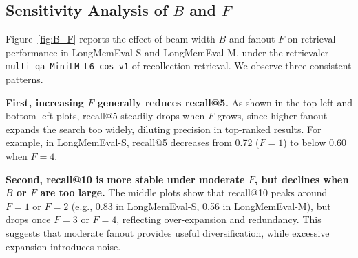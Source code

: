 


\subsection{Sensitivity Analysis of $B$ and $F$}
\label{app:B_F}
Figure~\ref{fig:B_F} reports the effect of beam width $B$ and fanout $F$ on retrieval performance in LongMemEval-S and LongMemEval-M, under the retrievaler \texttt{multi-qa-MiniLM-L6-cos-v1} of recollection retrieval.  We observe three consistent patterns. 

\textbf{First, increasing $F$ generally reduces recall@5.}  
As shown in the top-left and bottom-left plots, recall@5 steadily drops when $F$ grows, since higher fanout expands the search too widely, diluting precision in top-ranked results. For example, in LongMemEval-S, recall@5 decreases from 0.72 ($F=1$) to below 0.60 when $F=4$.

\textbf{Second, recall@10 is more stable under moderate $F$, but declines when $B$ or $F$ are too large.}  
The middle plots show that recall@10 peaks around $F=1$ or $F=2$ (e.g., 0.83 in LongMemEval-S, 0.56 in LongMemEval-M), but drops once $F=3$ or $F=4$, reflecting over-expansion and redundancy. This suggests that moderate fanout provides useful diversification, while excessive expansion introduces noise.

